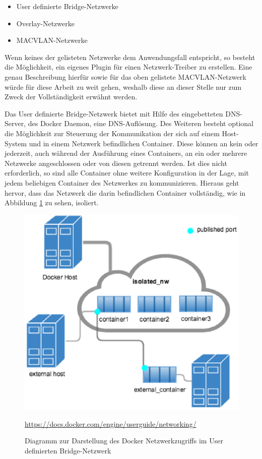 \begin{itemize}
	\item User definierte Bridge-Netzwerke
	\item Overlay-Netzwerke
	\item MACVLAN-Netzwerke
\end{itemize}

Wenn keines der gelisteten Netzwerke dem Anwendungsfall entspricht, so besteht die Möglichkeit, ein eigenes Plugin für einen Netzwerk-Treiber zu erstellen.
Eine genau Beschreibung hierfür sowie für das oben gelistete MACVLAN-Netzwerk würde für diese Arbeit zu weit gehen, weshalb diese an dieser Stelle nur zum Zweck der Vollständigkeit erwähnt werden.

Das User definierte Bridge-Netzwerk bietet mit Hilfe des eingebetteten DNS-Server, des Docker Daemon, eine DNS-Auflösung.
Des Weiteren besteht optional die Möglichkeit zur Steuerung der Kommunikation der sich auf einem Host-System und in einem Netzwerk befindlichen Container.
Diese können an kein oder jederzeit, auch während der Ausführung eines Containers, an ein oder mehrere Netzwerke angeschlossen oder von diesen getrennt werden.
Ist dies nicht erforderlich, so sind alle Container ohne weitere Konfiguration in der Lage, mit jedem beliebigen Container des Netzwerkes zu kommunizieren.
Hieraus geht hervor, dass das Netzwerk die darin befindlichen Container vollständig, wie in Abbildung \ref{fig:dockerportpuex} zu sehen, isoliert.

\begin{figure}
	\centering
	\includegraphics[width=0.7\linewidth]{figures/DockerPortPuEx}
	\caption[Docker Netzwerkzugriff]{Diagramm zur Darstellung des Docker Netzwerkzugriffs im User definierten Bridge-Netzwerk}
	\label{fig:dockerportpuex}
	\tiny{\quelle\url{https://docs.docker.com/engine/userguide/networking/}}
\end{figure}

